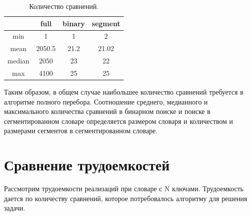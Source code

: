 \begin{table}[h!]
	\begin{center}
		\begin{tabular}{|c | c | c | c |}
			\hline
			 & full & binary & segment \\
			\hline
			min & 1 & 1 & 2 \\
			mean & 2050.5 & 21.2 & 21.02 \\
			median & 2050 & 23 & 22 \\
			max & 4100 & 25 & 25 \\
			\hline
		\end{tabular}
	\end{center}
	\caption{\label{tab:cmp} Количество сравнений.}
\end{table}



Таким образом, в общем случае наибольшее количество сравнений требуется в алгоритме полного перебора. Соотношение среднего, медианного и максимального количества сравнений в бинарном поиске и поиске в сегментированном словаре определяется размером словаря и количеством и размерами сегментов в сегментированном словаре.

\clearpage
\section{Сравнение трудоемкостей}

Рассмотрим трудоемкости реализаций при словаре с N ключами. Трудоемкость дается по количеству сравнений, которое потребовалось алгоритму для решения задачи.

